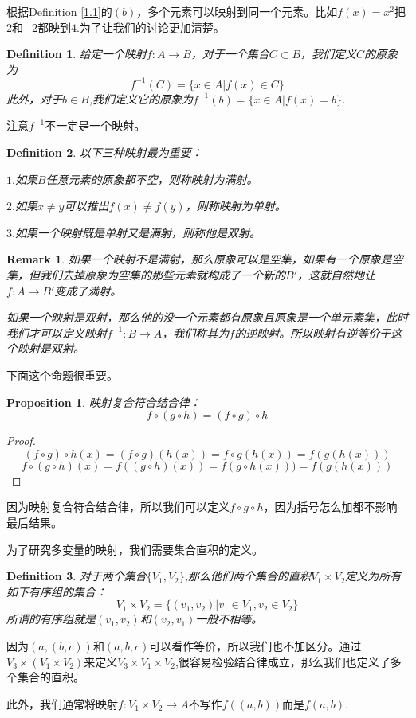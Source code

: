 \documentclass[11pt,a4paper,openany]{book}%
\theoremstyle{plain}%
\newtheorem{pro}{Proposition}[chapter]%
\newtheorem*{rem}{Remark}%
\newtheorem{defi}{Definition}[chapter]%
\begin{document}
根据Definition \ref{1.1}的$(b)$，多个元素可以映射到同一个元素。比如$f(x)=x^2$把$2$和$-2$都映到$4$.为了让我们的讨论更加清楚。
\begin{defi}
给定一个映射$f:A\rightarrow B$，对于一个集合$C\subset B$，我们定义$C$的原象为
\[
f^{-1}(C)=\{x\in A|f(x)\in C\}
\]
此外，对于$b\in B$,我们定义它的原象为$f^{-1}(b)=\{x\in A |f(x)=b\}$.
\end{defi}
注意$f^{-1}$不一定是一个映射。
\begin{defi}以下三种映射最为重要：

$1.$如果$B$任意元素的原象都不空，则称映射为满射。

$2.$如果$x \neq y$可以推出$f(x) \neq f(y)$，则称映射为单射。

$3.$如果一个映射既是单射又是满射，则称他是双射。
\end{defi}
\begin{rem}
如果一个映射不是满射，那么原象可以是空集，如果有一个原象是空集，但我们去掉原象为空集的那些元素就构成了一个新的$B'$，这就自然地让$f:A\rightarrow B'$变成了满射。

如果一个映射是双射，那么他的没一个元素都有原象且原象是一个单元素集，此时我们才可以定义映射$f^{-1}:B\rightarrow A$，我们称其为$f$的逆映射。所以映射有逆等价于这个映射是双射。
\end{rem}
下面这个命题很重要。
\begin{pro}映射复合符合结合律：
\[
f \circ (g \circ h)=(f \circ g) \circ h
\]
\end{pro}
\begin{proof}
\[
(f \circ g) \circ h(x)=(f \circ g)(h(x))=f \circ g(h(x))=f(g(h(x)))
\]
\[
f \circ (g\circ h)(x)=f((g \circ h)(x))=f(g \circ h (x)))=f(g(h(x)))
\]
\end{proof}
因为映射复合符合结合律，所以我们可以定义$f \circ g \circ h$，因为括号怎么加都不影响最后结果。

为了研究多变量的映射，我们需要集合直积的定义。
\begin{defi}
对于两个集合$\{V_1,V_2\}$,那么他们两个集合的直积$V_1\times V_2$定义为所有如下有序组的集合：
\[
V_1\times V_2=\{(v_1,v_2)|v_1\in V_1, v_2\in V_2\}
\]
所谓的有序组就是$(v_1,v_2)$和$(v_2,v_1)$一般不相等。
\end{defi}
因为$(a,(b,c))$和$(a,b,c)$可以看作等价，所以我们也不加区分。通过$V_3\times (V_1\times V_2)$来定义$V_3\times V_1\times V_2$,很容易检验结合律成立，那么我们也定义了多个集合的直积。

此外，我们通常将映射$f:V_1\times V_2 \rightarrow A$不写作$f((a,b))$而是$f(a,b)$.
\end{document}
